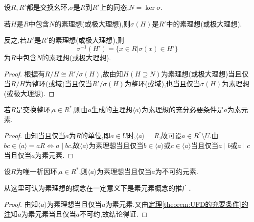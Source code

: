 \documentclass[../../main.tex]{subfiles}%
\begin{document}
\begin{theorem}\label{theorem:抽象代数--定理2.8.2}
设$R,R'$都是交换幺环,$\sigma$是$R$到$R'$上的同态,$N = \ker \sigma$.

若$H$是$R$中包含$N$的素理想(或极大理想),则$\sigma(H)$是$R'$中的素理想(或极大理想).

反之,若$H'$是$R'$的素理想(或极大理想),则
$$
\sigma^{-1}(H') = \{x \in R|\sigma(x) \in H'\}
$$
为$R$中包含$N$的素理想(或极大理想).
\end{theorem}
\begin{proof}

根据有$R/H \cong R'/ \sigma(H)$,故由知$H(H \supseteq N)$为素理想(或极大理想)当且仅当$R/H$为整环(或域)当且仅当$R'/ \sigma(H)$为整环(或域),也当且仅当$\sigma(H)$为素理想(或极大理想).

\end{proof}

\begin{theorem}\label{theorem:抽象代数--定理2.8.3}
若$R$是交换整环,$a \in R^*$,则由$a$生成的主理想$\langle a \rangle$为素理想的充分必要条件是$a$为素元素.
\end{theorem}
\begin{proof}

由知当且仅当$a$为$R$的单位,即$a \in U$时,$\langle a \rangle = R$,故可设$a \in R^* \setminus U$.由$bc \in \langle a \rangle = aR \iff a \mid bc$,故$\langle a \rangle$为素理想当且仅当$b\in \langle a \rangle$或$c\in \langle a \rangle$当且仅当$a\mid b$或$a\mid c$当且仅当$a$为素元素.

\end{proof}

\begin{corollary}\label{corollary:抽象代数--推论2.8.2}
设$R$为唯一析因环,$a \in R^*$,则$\langle a \rangle$为素理想当且仅当$a$为不可约元素.
\end{corollary}
\begin{remark}
从这里可认为素理想的概念在一定意义下是素元素概念的推广.
\end{remark}
\begin{proof}

由知$\langle a \rangle$为素理想当且仅当$a$为素元素.又由\hyperref[theorem:UFD的充要条件]{定理\ref{theorem:UFD的充要条件}的注}知$a$为素元素当且仅当$a$不可约,故结论得证.

\end{proof}
\end{document}
